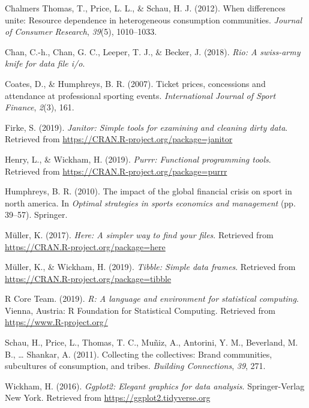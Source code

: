 \documentclass[man, fleqn, noextraspace,floatsintext]{apa6}
\begin{document}
\hypertarget{ref-chalmers_et_al_2012}{}
Chalmers Thomas, T., Price, L. L., \& Schau, H. J. (2012). When
differences unite: Resource dependence in heterogeneous consumption
communities. \emph{Journal of Consumer Research}, \emph{39}(5),
1010--1033.

\hypertarget{ref-R-rio}{}
Chan, C.-h., Chan, G. C., Leeper, T. J., \& Becker, J. (2018).
\emph{Rio: A swiss-army knife for data file i/o}.

\hypertarget{ref-coates_humphreys_2007}{}
Coates, D., \& Humphreys, B. R. (2007). Ticket prices, concessions and
attendance at professional sporting events. \emph{International Journal
of Sport Finance}, \emph{2}(3), 161.

\hypertarget{ref-R-janitor}{}
Firke, S. (2019). \emph{Janitor: Simple tools for examining and cleaning
dirty data}. Retrieved from
\url{https://CRAN.R-project.org/package=janitor}

\hypertarget{ref-R-purrr}{}
Henry, L., \& Wickham, H. (2019). \emph{Purrr: Functional programming
tools}. Retrieved from \url{https://CRAN.R-project.org/package=purrr}

\hypertarget{ref-humphreys_2010}{}
Humphreys, B. R. (2010). The impact of the global financial crisis on
sport in north america. In \emph{Optimal strategies in sports economics
and management} (pp. 39--57). Springer.

\hypertarget{ref-R-here}{}
Müller, K. (2017). \emph{Here: A simpler way to find your files}.
Retrieved from \url{https://CRAN.R-project.org/package=here}

\hypertarget{ref-R-tibble}{}
Müller, K., \& Wickham, H. (2019). \emph{Tibble: Simple data frames}.
Retrieved from \url{https://CRAN.R-project.org/package=tibble}

\hypertarget{ref-R-base}{}
R Core Team. (2019). \emph{R: A language and environment for statistical
computing}. Vienna, Austria: R Foundation for Statistical Computing.
Retrieved from \url{https://www.R-project.org/}

\hypertarget{ref-shankar_et_al_2011}{}
Schau, H., Price, L., Thomas, T. C., Muñiz, A., Antorini, Y. M.,
Beverland, M. B., \ldots{} Shankar, A. (2011). Collecting the
collectives: Brand communities, subcultures of consumption, and tribes.
\emph{Building Connections}, \emph{39}, 271.

\hypertarget{ref-R-ggplot2}{}
Wickham, H. (2016). \emph{Ggplot2: Elegant graphics for data analysis}.
Springer-Verlag New York. Retrieved from
\url{https://ggplot2.tidyverse.org}
\end{document}
